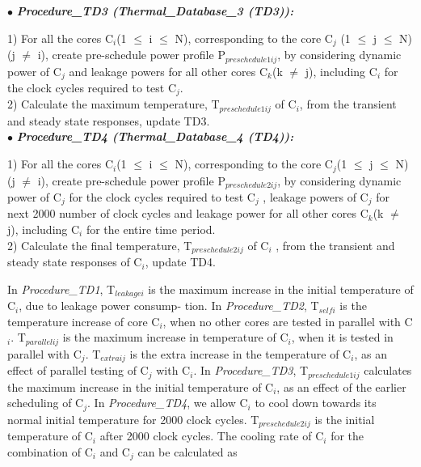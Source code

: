\documentclass[conference]{IEEEtran}
\begin{document}
$\bullet$ \textbf{\textit{Procedure\_TD3 (Thermal\_Database\_3 (TD3)):}}

	\par
	1) For all the cores C$_{i}$(1 $\leq$ i $\leq$ N), corresponding to the core
C$_{j}$ (1 $\leq$ j $\leq$ N)(j $\neq$ i), create pre-schedule power profile
P$_{preschedule1ij}$, by considering dynamic power of C$_{j}$ and
leakage powers for all other cores C$_{k}$(k $\neq$ j), including C$_{i}$
for the clock cycles required to test C$_{j}$.\\
\hspace*{.33 cm}2) Calculate the maximum temperature, T$_{preschedule1ij}$ of C$_{i}$,
from the transient and steady state responses, update TD3.\\

$\bullet$ \textbf{\textit{Procedure\_TD4 (Thermal\_Database\_4 (TD4)):}}

	\par
	1) For all the cores C$_{i}$(1 $\leq$ i $\leq$ N), corresponding to the
core C$_{j}$(1 $\leq$ j $\leq$ N)(j $\neq$ i), create pre-schedule power
profile P$_{preschedule2ij}$, by considering dynamic power of C$_{j}$
for the clock cycles required to test C$_{j}$ , leakage powers of
C$_{j}$ for next 2000 number of clock cycles and leakage power
for all other cores C$_{k}$(k $\neq$ j), including C$_{i}$ for the entire
time period.\\
\hspace*{.33 cm}2) Calculate the final temperature, T$_{preschedule2ij}$ of C$_{i}$ , from
the transient and steady state responses of C$_{i}$, update TD4.\\


	\par
	In \textit{Procedure\_TD1}, T$_{leakagei}$ is the maximum increase in
the initial temperature of C$_{i}$, due to leakage power consump-
tion. In \textit{Procedure\_TD2}, T$_{selfi}$ is the temperature increase
of core C$_{i}$, when no other cores are tested in parallel with C$_{i}$.
T$_{parallelij}$ is the maximum increase in temperature of C$_{i}$, when
it is tested in parallel with C$_{j}$. T$_{extraij}$ is the extra increase
in the temperature of C$_{i}$, as an effect of parallel testing of
C$_{j}$ with C$_{i}$. In \textit{Procedure\_TD3}, T$_{preschedule1ij}$ calculates
the maximum increase in the initial temperature of C$_{i}$, as an
effect of the earlier scheduling of C$_{j}$. In \textit{Procedure\_TD4}, we
allow C$_{i}$ to cool down towards its normal initial temperature
for 2000 clock cycles. T$_{preschedule2ij}$ is the initial temperature
of C$_{i}$ after 2000 clock cycles. The cooling rate of C$_{i}$ for the
combination of C$_{i}$ and C$_{j}$ can be calculated as
\end{document}
